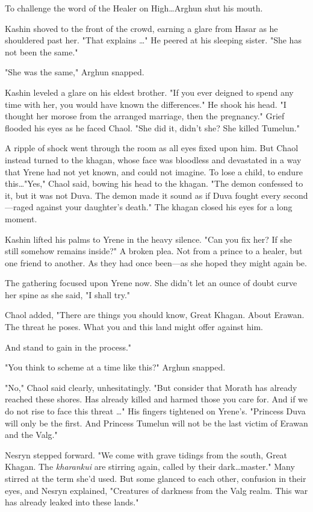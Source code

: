 To challenge the word of the Healer on High\ldots Arghun shut his mouth.

Kashin shoved to the front of the crowd, earning a glare from Hasar as he shouldered past her.
"That explains \ldots" He peered at his sleeping sister.
"She has not been the same."

"She was the same," Arghun snapped.

Kashin leveled a glare on his eldest brother.
"If you ever deigned to spend any time with her, you would have known the differences."
He shook his head.
"I thought her morose from the arranged marriage, then the pregnancy."
Grief flooded his eyes as he faced Chaol.
"She did it, didn't she?
She killed Tumelun."

A ripple of shock went through the room as all eyes fixed upon him.
But Chaol instead turned to the khagan, whose face was bloodless and devastated in a way that Yrene had not yet known, and could not imagine.
To lose a child, to endure this\ldots "Yes," Chaol said, bowing his head to the khagan.
"The demon confessed to it, but it was not Duva.
The demon made it sound as if Duva fought every second---raged against your daughter's death."
The khagan closed his eyes for a long moment.

Kashin lifted his palms to Yrene in the heavy silence.
"Can you fix her?
If she still somehow remains inside?"
A broken plea.
Not from a prince to a healer, but one friend to another.
As they had once been---as she hoped they might again be.

The gathering focused upon Yrene now.
She didn't let an ounce of doubt curve her spine as she said, "I shall try."

Chaol added, "There are things you should know, Great Khagan.
About Erawan.
The threat he poses.
What you and this land might offer against him.

And stand to gain in the process."

"You think to scheme at a time like this?"
Arghun snapped.

"No," Chaol said clearly, unhesitatingly.
"But consider that Morath has already reached these shores.
Has already killed and harmed those you care for.
And if we do not rise to face this threat \ldots" His fingers tightened on Yrene's.
"Princess Duva will only be the first.
And Princess Tumelun will not be the last victim of Erawan and the Valg."

Nesryn stepped forward.
"We come with grave tidings from the south, Great Khagan.
The \emph{kharankui} are stirring again, called by their dark\ldots master."
Many stirred at the term she'd used.
But some glanced to each other, confusion in their eyes, and Nesryn explained, "Creatures of darkness from the Valg realm.
This war has already leaked into these lands."


